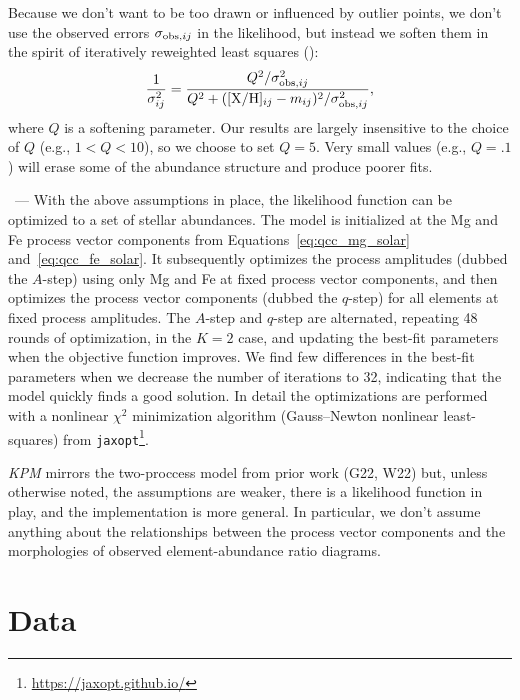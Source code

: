 \documentclass[modern]{aastex631}
\newcommand{\xh}{[{\rm X}/{\rm H}]}
\newcommand{\name}{\textsl{KPM}}
\renewcommand{\paragraph}[1]{\bigskip\par\noindent{\textbf{#1}}~---}
\begin{document}
Because we don't want to be too drawn or influenced by outlier points, we don't use the observed errors $\sigma_{{\rm obs},ij}$ in the likelihood, but instead we soften them in the spirit of iteratively reweighted least squares (\citealt{irls}):
\begin{equation}\label{eq:inflate_ivar}
    \frac{1}{\sigma_{ij}^2} = \frac{Q^2/\sigma_{{\rm obs},ij}^2}{Q^2 + (\xh_{ij} - m_{ij})^2 /\sigma_{{\rm obs},ij}^2 },    
\end{equation}
where $Q$ is a softening parameter. Our results are largely insensitive to the choice of $Q$ (e.g., $1 < Q < 10$), so we choose to set $Q=5$. Very small values (e.g., $Q=.1$) will erase some of the abundance structure and produce poorer fits.

\paragraph{9. Implementation and optimization} 
With the above assumptions in place, the likelihood function can be optimized to a set of stellar abundances.
The model is initialized at the Mg and Fe process vector components from Equations~\ref{eq:qcc_mg_solar} and~\ref{eq:qcc_fe_solar}. It subsequently optimizes the process amplitudes (dubbed the $A$-step) using only Mg and Fe at fixed process vector components, and then optimizes the process vector components (dubbed the $q$-step) for all elements at fixed process amplitudes.
The $A$-step and $q$-step are alternated, repeating 48 rounds of optimization, in the $K=2$ case, and updating the best-fit parameters when the objective function improves. We find few differences in the best-fit parameters when we decrease the number of iterations to 32, indicating that the model quickly finds a good solution.  
In detail the optimizations are performed with a nonlinear $\chi^2$ minimization algorithm (Gauss--Newton nonlinear least-squares) from \texttt{jaxopt}\footnote{\url{https://jaxopt.github.io/}}.

\bigskip
\name{} mirrors the two-proccess model from prior work (G22, W22) but, unless otherwise noted, the assumptions are weaker, there is a likelihood function in play, and the implementation is more general.
In particular, we don't assume anything about the relationships between the process vector components and the morphologies of observed element-abundance ratio diagrams.

\section{Data}\label{sec:data}
\end{document}
